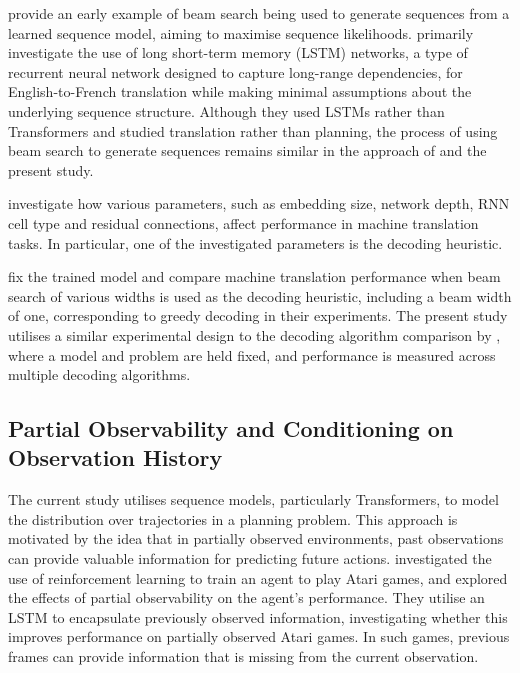 ﻿\documentclass[12pt,a4paper]{article}
\theoremstyle{definition}
\begin{document}
\citet{sutskever2014sequence} provide an early example of beam search being used to generate
sequences from a learned sequence model, aiming to maximise sequence likelihoods.
\citet{sutskever2014sequence} primarily investigate the use of long short-term memory (LSTM) networks, a type of
recurrent neural network designed to capture long-range dependencies, for English-to-French translation
while making minimal assumptions about the underlying sequence structure. Although they used LSTMs rather than
Transformers and studied translation rather than planning, the process of using beam search
to generate sequences remains similar in the approach of \citet{sutskever2014sequence} and the present study.

\citet{britz2017massive} investigate
how various parameters, such as embedding size, network depth, RNN cell type and residual connections,
affect performance in machine translation tasks. In particular, one of the investigated parameters is
the decoding heuristic. 

\citet{britz2017massive} fix the trained model and compare machine translation performance when beam search of various
widths is used as the decoding heuristic, including a beam width of one, corresponding to greedy decoding in
their experiments. 
The present study utilises a similar experimental design to the decoding algorithm comparison by
\citet{britz2017massive}, where a model and problem are held fixed, and performance is measured across multiple
decoding algorithms.

\subsection{Partial Observability and Conditioning on Observation History}

The current study utilises sequence models, particularly Transformers, to model the 
distribution over trajectories in a planning problem. This approach is motivated by the idea that 
in partially observed environments, past observations can provide valuable information for 
predicting future actions.
\citet{hausknecht2015deep} investigated the use of reinforcement learning to train an agent 
to play Atari games, and explored the effects of partial observability on the agent's performance.
They utilise an LSTM to encapsulate previously observed information, investigating whether this improves
performance on partially observed Atari games. In such games, previous frames can provide information
that is missing from the current observation. 
\end{document}
